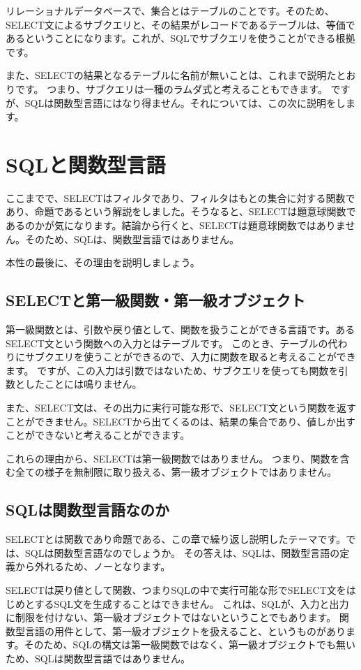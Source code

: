 リレーショナルデータベースで、集合とはテーブルのことです。そのため、SELECT文によるサブクエリと、その結果がレコードであるテーブルは、等価であるということになります。これが、SQLでサブクエリを使うことができる根拠です。

また、SELECTの結果となるテーブルに名前が無いことは、これまで説明たとおりです。
つまり、サブクエリは一種のラムダ式と考えることもできます。
ですが、SQLは関数型言語にはなり得ません。それについては、この次に説明をします。

\section{SQLと関数型言語}

ここまでで、SELECTはフィルタであり、フィルタはもとの集合に対する関数であり、命題であるという解説をしました。そうなると、SELECTは題意球関数であるのかが気になります。結論から行くと、SELECTは題意球関数ではありません。そのため、SQLは、関数型言語ではありません。

本性の最後に、その理由を説明しましょう。

\subsection{SELECTと第一級関数・第一級オブジェクト}

第一級関数とは、引数や戻り値として、関数を扱うことができる言語です。あるSELECT文という関数への入力とはテーブルです。
このとき、テーブルの代わりにサブクエリを使うことができるので、入力に関数を取ると考えることができます。
ですが、この入力は引数ではないため、サブクエリを使っても関数を引数としたことには鳴りません。

また、SELECT文は、その出力に実行可能な形で、SELECT文という関数を返すことができません。SELECTから出てくるのは、結果の集合であり、値しか出すことができないと考えることができます。

これらの理由から、SELECTは第一級関数ではありません。
つまり、関数を含む全ての様子を無制限に取り扱える、第一級オブジェクトではありません。

\subsection{SQLは関数型言語なのか}

SELECTとは関数であり命題である、この章で繰り返し説明したテーマです。では、SQLは関数型言語なのでしょうか。
その答えは、SQLは、関数型言語の定義から外れるため、ノーとなります。

SELECTは戻り値として関数、つまりSQLの中で実行可能な形でSELECT文をはじめとするSQL文を生成することはできません。
これは、SQLが、入力と出力に制限を付けない、第一級オブジェクトではないということでもあります。
関数型言語の用件として、第一級オブジェクトを扱えること、というものがあります。そのため、SQLの構文は第一級関数ではなく、第一級オブジェクトでも無いため、SQLは関数型言語ではありません。
